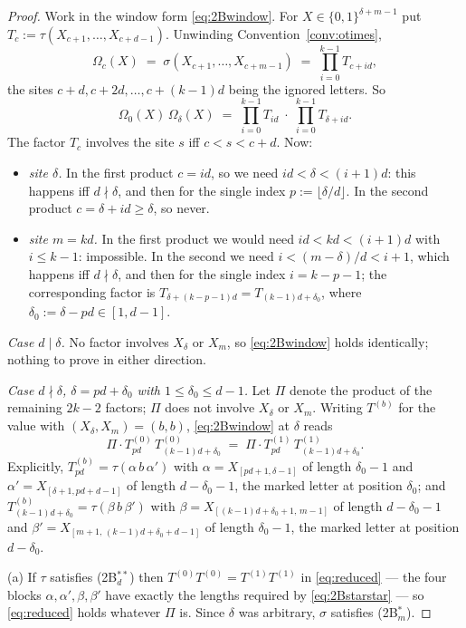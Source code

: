 \documentclass[11pt]{article}
\theoremstyle{definition}
\theoremstyle{remark}
\begin{document}
\begin{proof}
Work in the window form \eqref{eq:2Bwindow}.  For $X\in\{0,1\}^{\delta+m-1}$ put
$T_c:=\tau(X_{c+1},\dots,X_{c+d-1})$.  Unwinding Convention~\ref{conv:otimes},
\[
   \Omega_c(X)\;=\;\sigma(X_{c+1},\dots,X_{c+m-1})\;=\;\prod_{i=0}^{k-1}T_{c+id},
\]
the sites $c+d,c+2d,\dots,c+(k-1)d$ being the ignored letters.  So
\[
   \Omega_0(X)\,\Omega_\delta(X)\;=\;\prod_{i=0}^{k-1}T_{id}\;\cdot\;
       \prod_{i=0}^{k-1}T_{\delta+id}.
\]
The factor $T_c$ involves the site $s$ iff $c<s<c+d$.  Now:
\begin{itemize}
\item \emph{site $\delta$.}  In the first product $c=id$, so we need $id<\delta<(i+1)d$:
  this happens iff $d\nmid\delta$, and then for the single index $p:=\lfloor\delta/d\rfloor$.
  In the second product $c=\delta+id\ge\delta$, so never.
\item \emph{site $m=kd$.}  In the first product we would need $id<kd<(i+1)d$ with
  $i\le k-1$: impossible.  In the second we need $i<(m-\delta)/d<i+1$, which happens iff
  $d\nmid\delta$, and then for the single index $i=k-p-1$; the corresponding factor is
  $T_{\delta+(k-p-1)d}=T_{(k-1)d+\delta_0}$, where $\delta_0:=\delta-pd\in[1,d-1]$.
\end{itemize}

\emph{Case $d\mid\delta$.}  No factor involves $X_\delta$ or $X_m$, so
\eqref{eq:2Bwindow} holds identically; nothing to prove in either direction.

\emph{Case $d\nmid\delta$, $\delta=pd+\delta_0$ with $1\le\delta_0\le d-1$.}  Let
$\Pi$ denote the product of the remaining $2k-2$ factors; $\Pi$ does not involve $X_\delta$
or $X_m$.  Writing $T^{(b)}$ for the value with $(X_\delta,X_m)=(b,b)$,
\eqref{eq:2Bwindow} at $\delta$ reads
\begin{equation}\label{eq:reduced}
   \Pi\cdot T^{(0)}_{pd}\,T^{(0)}_{(k-1)d+\delta_0}
   \;=\;\Pi\cdot T^{(1)}_{pd}\,T^{(1)}_{(k-1)d+\delta_0}.
\end{equation}
Explicitly, $T^{(b)}_{pd}=\tau(\alpha\,b\,\alpha')$ with
$\alpha=X_{[pd+1,\delta-1]}$ of length $\delta_0-1$ and $\alpha'=X_{[\delta+1,pd+d-1]}$ of
length $d-\delta_0-1$, the marked letter at position $\delta_0$; and
$T^{(b)}_{(k-1)d+\delta_0}=\tau(\beta\,b\,\beta')$ with
$\beta=X_{[(k-1)d+\delta_0+1,\,m-1]}$ of length $d-\delta_0-1$ and
$\beta'=X_{[m+1,\,(k-1)d+\delta_0+d-1]}$ of length $\delta_0-1$, the marked letter at
position $d-\delta_0$.

(a) If $\tau$ satisfies (2B$^{**}_d$) then $T^{(0)}T^{(0)}=T^{(1)}T^{(1)}$ in
\eqref{eq:reduced} --- the four blocks $\alpha,\alpha',\beta,\beta'$ have exactly the lengths
required by \eqref{eq:2Bstarstar} --- so \eqref{eq:reduced} holds whatever $\Pi$ is.  Since
$\delta$ was arbitrary, $\sigma$ satisfies (2B$^*_m$).


\end{proof}
\end{document}

